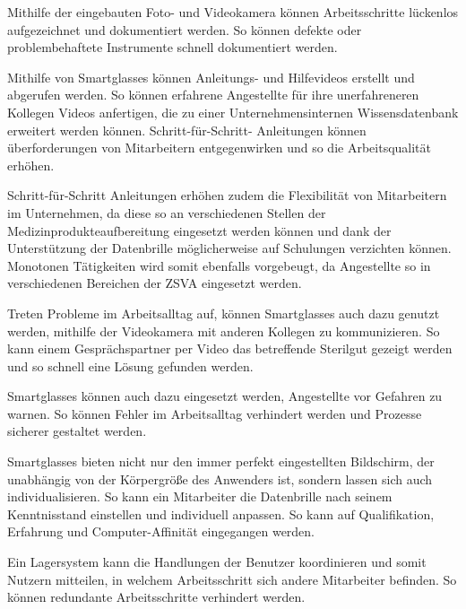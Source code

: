 Mithilfe der eingebauten Foto- und Videokamera können Arbeitsschritte lückenlos aufgezeichnet und dokumentiert werden. So können defekte oder problembehaftete Instrumente schnell dokumentiert werden.

Mithilfe von Smartglasses können Anleitungs- und Hilfevideos erstellt und abgerufen werden. So können erfahrene Angestellte für ihre unerfahreneren Kollegen Videos anfertigen, die zu einer Unternehmensinternen Wissensdatenbank erweitert werden können. Schritt-für-Schritt- Anleitungen können überforderungen von Mitarbeitern entgegenwirken und so die Arbeitsqualität erhöhen.

Schritt-für-Schritt Anleitungen erhöhen zudem die Flexibilität von Mitarbeitern im Unternehmen, da diese so an verschiedenen Stellen der Medizinprodukteaufbereitung eingesetzt werden können und dank der Unterstützung der Datenbrille möglicherweise auf Schulungen verzichten können. Monotonen Tätigkeiten wird somit ebenfalls vorgebeugt, da Angestellte so in verschiedenen Bereichen der ZSVA eingesetzt werden.

Treten Probleme im Arbeitsalltag auf, können Smartglasses auch dazu genutzt werden, mithilfe der Videokamera mit anderen Kollegen zu kommunizieren. So kann einem Gesprächspartner per Video das betreffende Sterilgut gezeigt werden und so schnell eine Lösung gefunden werden.

Smartglasses können auch dazu eingesetzt werden, Angestellte vor Gefahren zu warnen. So können Fehler im Arbeitsalltag verhindert werden und Prozesse sicherer gestaltet werden.

Smartglasses bieten nicht nur den immer perfekt eingestellten Bildschirm, der unabhängig von der Körpergröße des Anwenders ist, sondern lassen sich auch individualisieren. So kann ein Mitarbeiter die Datenbrille nach seinem Kenntnisstand einstellen und individuell anpassen. So kann auf Qualifikation, Erfahrung und Computer-Affinität eingegangen werden.

Ein Lagersystem kann die Handlungen der Benutzer koordinieren und somit Nutzern mitteilen, in welchem Arbeitsschritt sich andere Mitarbeiter befinden. So können redundante Arbeitsschritte verhindert werden. 
%
%
